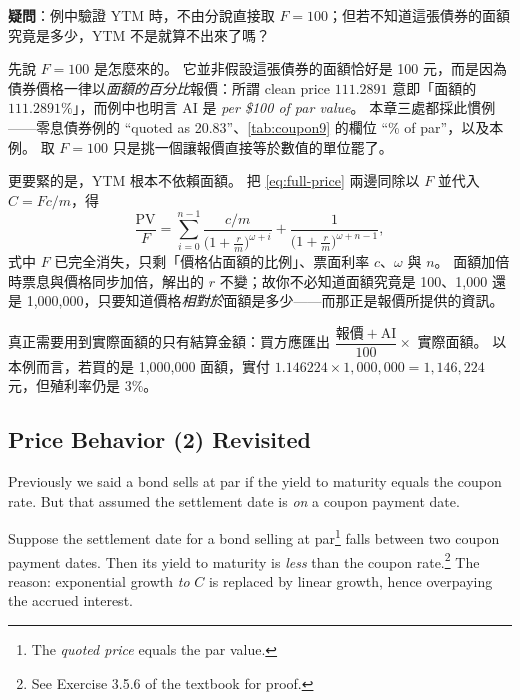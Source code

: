 \suppstart
\begin{remark}
	\textbf{疑問}：例中驗證 YTM 時，不由分說直接取 $F = 100$；但若不知道這張債券的面額究竟是多少，YTM 不是就算不出來了嗎？

	先說 $F = 100$ 是怎麼來的。
	它並非假設這張債券的面額恰好是 100 元，而是因為債券價格一律以\emph{面額的百分比}報價：所謂 clean price $111.2891$ 意即「面額的 $111.2891\%$」，而例中也明言 AI 是 \emph{per \$100 of par value}。
	本章三處都採此慣例——零息債券例的 ``quoted as 20.83''、\autoref{tab:coupon9} 的欄位 ``\% of par''，以及本例。
	取 $F = 100$ 只是挑一個讓報價直接等於數值的單位罷了。

	更要緊的是，YTM 根本不依賴面額。
	把 \eqref{eq:full-price} 兩邊同除以 $F$ 並代入 $C = Fc/m$，得
	\[
		\frac{\mathrm{PV}}{F} = \sum_{i=0}^{n-1}
		\frac{c/m}{\bigl(1+\frac{r}{m}\bigr)^{\omega+i}}
		+ \frac{1}{\bigl(1+\frac{r}{m}\bigr)^{\omega+n-1}} ,
	\]
	式中 $F$ 已完全消失，只剩「價格佔面額的比例」、票面利率 $c$、$\omega$ 與 $n$。
	面額加倍時票息與價格同步加倍，解出的 $r$ 不變；故你不必知道面額究竟是 100、1,000 還是 1,000,000，只要知道價格\emph{相對於}面額是多少——而那正是報價所提供的資訊。

	真正需要用到實際面額的只有結算金額：買方應匯出 $\dfrac{\text{報價} + \mathrm{AI}}{100} \times$ 實際面額。
	以本例而言，若買的是 1,000,000 面額，實付 $1.146224 \times 1{,}000{,}000 = 1{,}146{,}224$ 元，但殖利率仍是 $3\%$。
\end{remark}
\suppend

\subsection{Price Behavior (2) Revisited}

Previously we said a bond sells at par if the yield to maturity equals the coupon rate.
But that assumed the settlement date is \emph{on} a coupon payment date.

Suppose the settlement date for a bond selling at par\footnote{The \emph{quoted price} equals the par value.} falls between two coupon payment dates.
Then its yield to maturity is \emph{less} than the coupon rate.\footnote{See Exercise 3.5.6 of the textbook for proof.} The reason: exponential growth \emph{to} $C$ is replaced by linear growth, hence overpaying the accrued interest.

